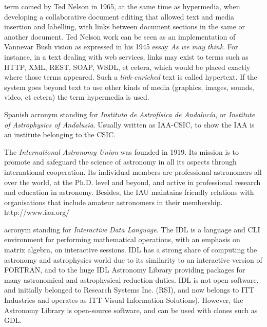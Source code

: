 {
    	term coined by Ted Nelson in 1965, at the same time as
        hypermedia, when developing a collaborative document editing
        that allowed text and media insertion and labelling, with links
        between document sections in the same or another document. Ted
        Nelson work can be seen as an implementation of Vannevar Bush
        vision as expressed in his 1945 essay \emph{As we may think}.
        For instance, in a text dealing with web services, links may
        exist to terms such as \gls{HTTP}, \gls{XML}, \gls{REST},
        \gls{SOAP}, \gls{WSDL}, et cetera,
		which would be placed exactly where
        those terms appeared. Such a \emph{link-enriched} text is
        called hypertext. If the system goes beyond text to use other
        kinds of media (graphics, images, sounds, video, et cetera) the term
        hypermedia is used.
}

{
    	Spanish acronym standing for \emph{Instituto de Astrofísica de
        Andalucía}, or \emph{Institute of Astrophysics of Andalusia}.
        Usually written as IAA-CSIC, to show the IAA is an institute
        belonging to the \gls{CSIC}.
}

{
    	The \emph{International Astronomy Union} was founded in 1919.
        Its mission is to promote and safeguard the science of
        astronomy in all its aspects through international cooperation.
        Its individual members are professional astronomers all over
        the world, at the Ph.D. level and beyond, and active in
        professional research and education in astronomy. Besides, the
        IAU maintains friendly relations with organisations that
        include amateur astronomers in their membership.
        http://www.iau.org/
}

{
    	acronym standing for \emph{Interactive Data Language}. The IDL
        is a language and \gls{CLI} environment for performing
        mathematical operations, with an emphasis on matrix algebra, on
        \gls{interactive sessions}. IDL has a strong share of computing
        the astronomy and astrophysics world due to its similarity to
        an interactive version of FORTRAN, and to the huge \gls{IDL
        Astronomy Library} providing packages for many astronomical and
        astrophysical \gls{reduction} duties. IDL is not open software,
        and initially belonged to Research Systems Inc. (RSI), and now
        belongs to ITT Industries and operates as ITT Visual
        Information Solutions). However, the Astronomy Library is
        \gls{open-source} software, and can be used with clones such as
        \gls{GDL}.
}

